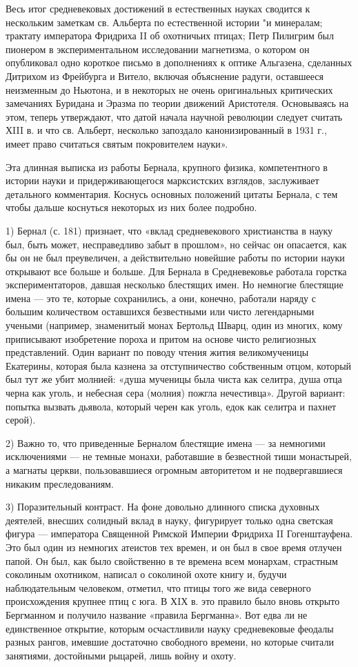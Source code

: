 Весь итог средневековых достижений в естественных науках сводится к
нескольким заметкам св. Альберта по естественной истории "и минералам;
трактату императора Фридриха II об охотничьих птицах; Петр Пилигрим был
пионером в экспериментальном исследовании магнетизма, о котором он
опубликовал одно короткое письмо в дополнениях к оптике Альгазена,
сделанных Дитрихом из Фрейбурга и Витело, включая объяснение радуги,
оставшееся неизменным до Ньютона, и в некоторых не очень оригинальных
критических замечаниях Буридана и Эразма по теории движений Аристотеля.
Основываясь на этом, теперь утверждают, что датой начала научной революции
следует считать ХIII в. и что св. Альберт, несколько запоздало
канонизированный в 1931 г., имеет право считаться святым покровителем
науки».

Эта длинная выписка из работы Бернала, крупного физика, компетентного в
истории науки и придерживающегося марксистских взглядов, заслуживает
детального комментария. Коснусь основных положений цитаты Бернала, с тем
чтобы дальше коснуться некоторых из них более подробно.

1) Бернал (с. 181) признает, что «вклад средневекового христианства в науку
был, быть может, несправедливо забыт в прошлом», но сейчас он опасается, как
бы он не был преувеличен, а действительно новейшие работы по истории науки
открывают все больше и больше. Для Бернала в Средневековье работала горстка
экспериментаторов, давшая несколько блестящих имен. Но немногие блестящие
имена --- это те, которые сохранились, а они, конечно, работали наряду с
большим количеством оставшихся безвестными или чисто легендарными учеными
(например, знаменитый монах Бертольд Шварц, один из многих, кому
приписывают изобретение пороха и притом на основе чисто религиозных
представлений. Один вариант по поводу чтения жития великомученицы
Екатерины, которая была казнена за отступничество собственным отцом,
который был тут же убит молнией: «душа мученицы была чиста как селитра,
душа отца черна как уголь, и небесная сера (молния) пожгла нечестивца».
Другой вариант: попытка вызвать дьявола, который черен как уголь, едок как
селитра и пахнет серой).

2) Важно то, что приведенные Берналом блестящие имена --- за немногими
исключениями --- не темные монахи, работавшие в безвестной тиши монастырей, а
магнаты церкви, пользовавшиеся огромным авторитетом и не подвергавшиеся
никаким преследованиям.

3) Поразительный контраст. На фоне довольно длинного списка духовных
деятелей, внесших солидный вклад в науку, фигурирует только одна светская
фигура --- императора Священной Римской Империи Фридриха II Гогенштауфена. Это
был один из немногих атеистов тех времен, и он был в свое время отлучен
папой. Он был, как было свойственно в те времена всем монархам, страстным
соколиным охотником, написал о соколиной охоте книгу и, будучи
наблюдательным человеком, отметил, что птицы того же вида северного
происхождения крупнее птиц с юга. В ХIХ в. это правило было вновь открыто
Бергманном и получило название «правила Бергманна». Вот едва ли не
единственное открытие, которым осчастливили науку средневековые феодалы
разных рангов, имевшие достаточно свободного времени, но которые считали
занятиями, достойными рыцарей, лишь войну и охоту.

